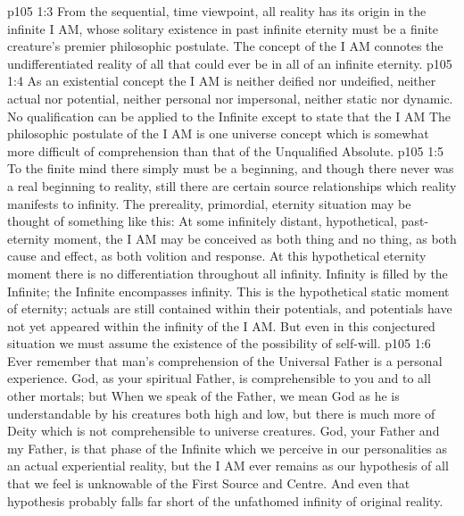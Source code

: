 \vs p105 1:3 \pc {} From the sequential, time viewpoint, all reality has its origin in the infinite I AM, whose solitary existence in past infinite eternity must be a finite creature’s premier philosophic postulate. The concept of the I AM connotes  the undifferentiated reality of all that could ever be in all of an infinite eternity.
\vs p105 1:4 As an existential concept the I AM is neither deified nor undeified, neither actual nor potential, neither personal nor impersonal, neither static nor dynamic. No qualification can be applied to the Infinite except to state that the I AM  The philosophic postulate of the I AM is one universe concept which is somewhat more difficult of comprehension than that of the Unqualified Absolute.
\vs p105 1:5 To the finite mind there simply must be a beginning, and though there never was a real beginning to reality, still there are certain source relationships which reality manifests to infinity. The prereality, primordial, eternity situation may be thought of something like this: At some infinitely distant, hypothetical, past\hyp{}eternity moment, the I AM may be conceived as both thing and no thing, as both cause and effect, as both volition and response. At this hypothetical eternity moment there is no differentiation throughout all infinity. Infinity is filled by the Infinite; the Infinite encompasses infinity. This is the hypothetical static moment of eternity; actuals are still contained within their potentials, and potentials have not yet appeared within the infinity of the I AM. But even in this conjectured situation we must assume the existence of the possibility of self\hyp{}will.
\vs p105 1:6 \pc Ever remember that man’s comprehension of the Universal Father is a personal experience. God, as your spiritual Father, is comprehensible to you and to all other mortals; but  When we speak of the Father, we mean God as he is understandable by his creatures both high and low, but there is much more of Deity which is not comprehensible to universe creatures. God, your Father and my Father, is that phase of the Infinite which we perceive in our personalities as an actual experiential reality, but the I AM ever remains as our hypothesis of all that we feel is unknowable of the First Source and Centre. And even that hypothesis probably falls far short of the unfathomed infinity of original reality.
